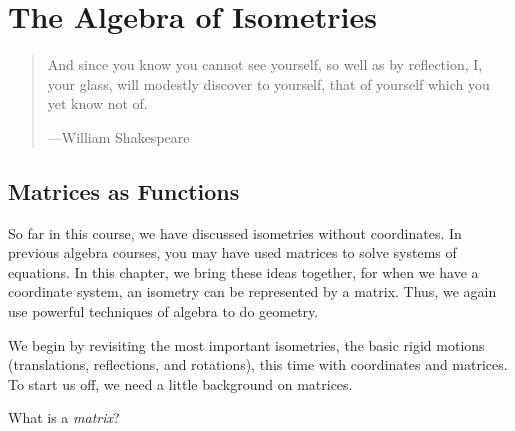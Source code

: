 \chapter{The Algebra of Isometries}

\begin{quote}
And since you know you cannot see yourself, so well as by reflection,
I, your glass, will modestly discover to yourself, that of yourself
which you yet know not of.

\hfill---William Shakespeare
\end{quote}




\section{Matrices as Functions}
So far in this course, we have discussed isometries without coordinates.  
In previous algebra courses, you may have used matrices to solve systems of equations.  
In this chapter, we bring these ideas together, for when we have a coordinate system, 
an isometry can be represented by a matrix.  
Thus, we again use powerful techniques of algebra to do geometry.  

We begin by revisiting the most important isometries, the basic rigid motions 
(translations, reflections, and rotations), this time with coordinates and matrices. 
To start us off, we need a little background on
matrices.

\begin{question} 
What is a \textit{matrix}?
\end{question}
\QM

